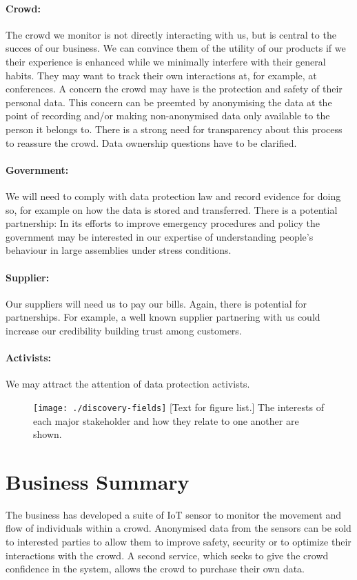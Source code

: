 \documentclass[12pt, oneside]{article}
\begin{document}
\paragraph{Crowd:} The crowd we monitor is not directly interacting with us, but is central to the succes of our business. We can convince them of the utility of our products if we their experience is enhanced while we minimally interfere with their general habits. They may want to track their own interactions at, for example, at conferences. A concern the crowd may have is the protection and safety of their personal data. This concern can be preemted by anonymising the data at the point of recording and/or making non-anonymised data only available to the person it belongs to. There is a strong need for transparency about this process to reassure the crowd. Data ownership questions have to be clarified.

\paragraph{Government:} We will need to comply with data protection law and record evidence for doing so, for example on how the data is stored and transferred. There is a potential partnership: In its efforts to improve emergency procedures and policy the government may be interested in our expertise of understanding people's behaviour in large assemblies under stress conditions.

\paragraph{Supplier:} Our suppliers will need us to pay our bills. Again, there is potential for partnerships. For example, a well known supplier partnering with us could increase our credibility building trust among customers. 

\paragraph{Activists:} We may attract the attention of data protection activists.

\begin{figure}
\centering
\texttt{[image: ./discovery-fields]}
{[Text for figure list.]{\label{fig:fields} 
The interests of each major stakeholder and how they relate to one another are shown.}}
\end{figure}

\section{Business Summary}
The business has developed a suite of IoT sensor to monitor the movement and flow of individuals within a crowd.  Anonymised data from the sensors can be sold to interested parties to allow them to improve safety, security or to optimize their interactions with the crowd.  A second service, which seeks to give the crowd confidence in the system, allows the crowd to purchase their own data.  
\end{document}

